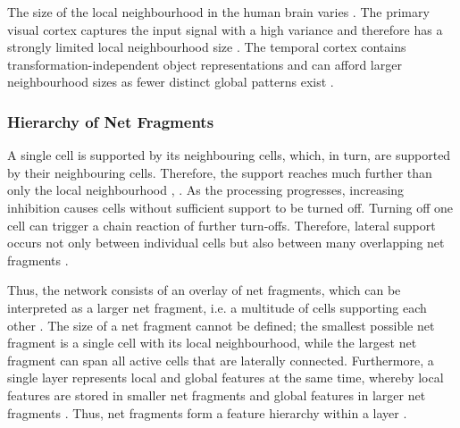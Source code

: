 The size of the local neighbourhood in the human brain varies .
The primary visual cortex captures the input signal with a high variance and therefore has a strongly limited local neighbourhood size . The temporal cortex contains transformation-independent object representations and can afford larger neighbourhood sizes as fewer distinct global patterns exist \cite{von_der_malsburg_concerning_2018}.

\subsubsection{Hierarchy of Net Fragments}
A single cell is supported by its neighbouring cells, which, in turn, are supported by their neighbouring cells. Therefore, the support reaches much further than only the local neighbourhood \cite{von_der_malsburg_concerning_2018}, .
As the processing progresses, increasing inhibition causes cells without sufficient support to be turned off. Turning off one cell can trigger a chain reaction of further turn-offs. Therefore, lateral support occurs not only between individual cells but also between many overlapping net fragments \cite{von_der_malsburg_theory_2022}.

Thus, the network consists of an overlay of net fragments, which can be interpreted as a larger net fragment, i.e. a multitude of cells supporting each other \cite{von_der_malsburg_theory_2022}.
The size of a net fragment cannot be defined; the smallest possible net fragment is a single cell with its local neighbourhood, while the largest net fragment can span all active cells that are laterally connected.
Furthermore, a single layer represents local and global features at the same time, whereby local features are stored in smaller net fragments and global features in larger net fragments \cite{von_der_malsburg_theory_2022}.
Thus, net fragments form a feature hierarchy within a layer \cite{von_der_malsburg_theory_2022}.

